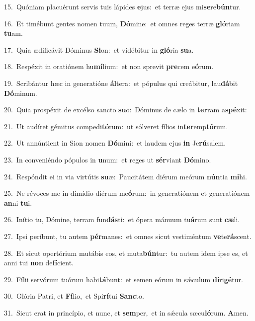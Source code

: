 {\numbfont\textcolor{\numbcolor}{15.}}~Quóniam placuérunt servis tuis lápides \textbf{e}\-jus:~\star et terræ ejus mi\-\textbf{se}\-re\-\textbf{bún}\-tur.\par
{\numbfont\textcolor{\numbcolor}{16.}}~Et timébunt gentes nomen tuum, \textbf{Dó}\-mine:~\star et omnes reges terræ \textbf{gló}\-riam \textbf{tu}\-am.\par
{\numbfont\textcolor{\numbcolor}{17.}}~Quia ædificávit Dóminus \textbf{Si}\-on:~\star et vidébitur in \textbf{gló}\-ria \textbf{su}\-a.\par
{\numbfont\textcolor{\numbcolor}{18.}}~Respéxit in oratiónem hu\-\textbf{mí}\-lium:~\star et non sprevit \textbf{pre}\-cem e\-\textbf{ó}\-rum.\par
{\numbfont\textcolor{\numbcolor}{19.}}~Scribántur hæc in generatióne \textbf{ál}\-tera:~\star et pópulus qui creábitur, lau\-\textbf{dá}\-bit \textbf{Dó}\-minum.\par
{\numbfont\textcolor{\numbcolor}{20.}}~Quia prospéxit de excélso sancto \textbf{su}\-o:~\star Dóminus de cælo in \textbf{ter}\-ram a\-\textbf{spé}\-xit:\par
{\numbfont\textcolor{\numbcolor}{21.}}~Ut audíret gémitus compedi\-\textbf{tó}\-rum:~\star ut sólveret fílios in\-\textbf{ter}\-emp\-\textbf{tó}\-rum.\par
{\numbfont\textcolor{\numbcolor}{22.}}~Ut annúntient in Sion nomen \textbf{Dó}\-mini:~\star et laudem ejus \textbf{in} Je\-\textbf{rú}\-salem.\par
{\numbfont\textcolor{\numbcolor}{23.}}~In conveniéndo pópulos in \textbf{u}\-num:~\star et reges ut \textbf{sér}\-viant \textbf{Dó}\-mino.\par
{\numbfont\textcolor{\numbcolor}{24.}}~Respóndit ei in via virtútis \textbf{su}\-æ:~\star Paucitátem diérum meórum \textbf{nún}\-tia \textbf{mi}\-hi.\par
{\numbfont\textcolor{\numbcolor}{25.}}~Ne révoces me in dimídio diérum me\-\textbf{ó}\-rum:~\star in generatiónem et generatiónem \textbf{an}\-ni \textbf{tu}\-i.\par
{\numbfont\textcolor{\numbcolor}{26.}}~Inítio tu, Dómine, terram fun\-\textbf{dás}\-ti:~\star et ópera mánuum tu\-\textbf{á}\-rum sunt \textbf{cæ}\-li.\par
{\numbfont\textcolor{\numbcolor}{27.}}~Ipsi períbunt, tu autem \textbf{pér}\-manes:~\star et omnes sicut vestiméntum \textbf{ve}\-te\-\textbf{rá}\-scent.\par
{\numbfont\textcolor{\numbcolor}{28.}}~Et sicut opertórium mutábis eos, et muta\-\textbf{bún}\-tur:~\star tu autem idem ipse es, et anni tui \textbf{non} de\-\textbf{fí}\-cient.\par
{\numbfont\textcolor{\numbcolor}{29.}}~Fílii servórum tuórum habi\-\textbf{tá}\-bunt:~\star et semen eórum in sǽculum \textbf{di}\-ri\-\textbf{gé}\-tur.\par
{\numbfont\textcolor{\numbcolor}{30.}}~Glória Patri, et \textbf{Fí}\-lio,~\star et Spi\-\textbf{rí}\-tui \textbf{Sanc}\-to.\par
{\numbfont\textcolor{\numbcolor}{31.}}~Sicut erat in princípio, et nunc, et \textbf{sem}\-per,~\star et in sǽcula sæcu\-\textbf{ló}\-rum. \textbf{A}\-men.\par
